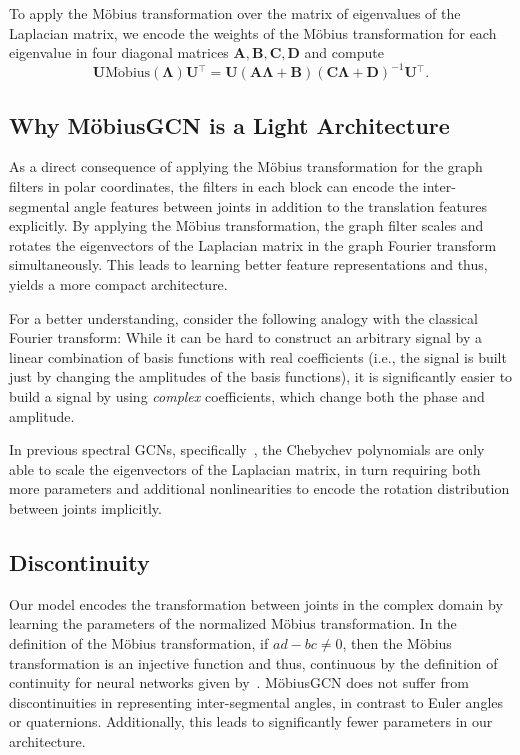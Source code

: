 \documentclass[runningheads]{llncs}
\newcommand{\mat}[1]{\ensuremath{\mathbf{#1}}}
\newcommand{\mob}{\ensuremath{\operatorname{M\ddot{o}bius}}}
\newcommand{\transpose}{\ensuremath{^\top}}
\begin{document}
To apply the M\"obius transformation over the matrix of eigenvalues of the Laplacian matrix, we encode the weights of the M\"obius transformation for each eigenvalue in four diagonal matrices $ \mat{A}, \mat{B}, \mat{C}, \mat{D}$ and compute
\begin{equation}
 \mat{U} \mob(\mat{\Lambda})\mat{U}\transpose = \mat{U}(\mat{A}\mat{\Lambda} + \mat{B})(\mat{C}\mat{\Lambda} + \mat{D})^{-1}\mat{U}\transpose.   
\end{equation}

\subsection{Why M\"obiusGCN is a Light Architecture}
As a direct consequence of applying the M\"obius transformation for the graph filters in polar coordinates, the filters in each block can encode the inter-segmental angle features between joints in addition to the translation features explicitly. By applying the M\"obius transformation, the graph filter scales and rotates the eigenvectors of the Laplacian matrix in the graph Fourier transform simultaneously. This leads to learning better feature representations and thus, yields a more compact architecture.

For a better understanding, consider the following analogy with the classical Fourier transform: While it can be hard to construct an arbitrary signal by a linear combination of basis functions with real coefficients (i.e., the signal is built just by changing the amplitudes of the basis functions), it is significantly easier to build a signal by using {\em complex} coefficients, which change both the phase and amplitude.


In previous spectral GCNs, specifically~\cite{kipf2016semi}, the Chebychev polynomials are only able to scale the eigenvectors of the Laplacian matrix, in turn requiring both more parameters and additional nonlinearities to encode the rotation distribution between joints implicitly. 

\subsection{Discontinuity}
Our model encodes the transformation between joints in the complex domain by learning the parameters of the normalized M\"obius transformation.
In the definition of the M\"obius transformation, if $ad - bc \neq 0$, then the M\"obius transformation is an injective function and thus, continuous by the definition of continuity for neural networks given by~\cite{zhou2019continuity}.
M\"obiusGCN does not suffer from discontinuities in representing inter-segmental angles, in contrast to Euler angles or quaternions. Additionally, this leads to significantly fewer parameters in our architecture.
\end{document}
